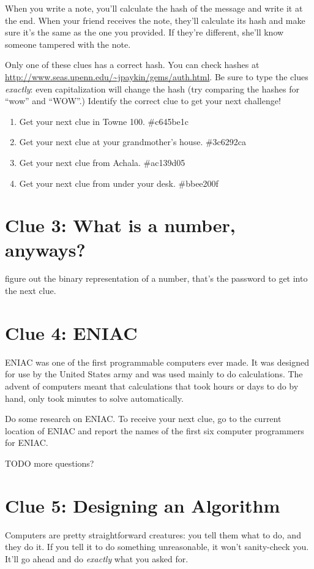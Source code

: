 \documentclass{article}
\begin{document}
When you write a note, you'll calculate the hash of the message and write it at the end. When your friend receives the note, they'll calculate its hash and make sure it's the same as the one you provided. If they're different, she'll know someone tampered with the note.

Only one of these clues has a correct hash. You can check hashes at \url{http://www.seas.upenn.edu/~jpaykin/gems/auth.html}. Be sure to type the clues \textit{exactly}: even capitalization will change the hash (try comparing the hashes for ``wow'' and ``WOW''.) Identify the correct clue to get your next challenge!

\begin{enumerate}
  \item Get your next clue in Towne 100. \#c645be1c
  \item Get your next clue at your grandmother's house. \#3c6292ca
  \item Get your next clue from Achala. \#ac139d05
  \item Get your next clue from under your desk. \#bbee200f
\end{enumerate}

\newpage

\section*{Clue 3: What is a number, anyways?}
figure out the binary representation of a number, that's the password to get into the next clue.


\newpage


\section*{Clue 4: ENIAC}
ENIAC was one of the first programmable computers ever made. It was designed for use by the United States army and was used mainly to do calculations. The advent of computers meant that calculations that took hours or days to do by hand, only took minutes to solve automatically.

Do some research on ENIAC. To receive your next clue, go to the current location of ENIAC and report the names of the first six computer programmers for ENIAC.

TODO more questions?

\newpage

\section*{Clue 5: Designing an Algorithm}
Computers are pretty straightforward creatures: you tell them what to do, and they do it. If you tell it to do something unreasonable, it won't sanity-check you. It'll go ahead and do \textit{exactly} what you asked for.
\end{document}
